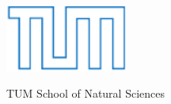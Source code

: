 \documentclass[12pt,twoside]{article}
\begin{document}
\newpage\null\thispagestyle{empty}\newpage

\thispagestyle{empty}
\begin{center}
  \includegraphics[width=0.3\textwidth]{../figures/TUMLogo_oZ_Outline_blau_CMYK-eps-converted-to.pdf}
  
  \vspace{3mm}
  \huge TUM School of Natural Sciences
  \vspace{3mm}  
  
\end{center}
\end{document}
